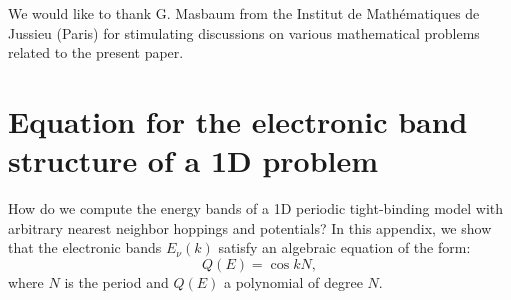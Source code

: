 \documentclass[]{revtex4-1}
\begin{document}
\acknowledgments

We would like to thank G. Masbaum from the Institut de Math\'ematiques de Jussieu (Paris) for stimulating discussions on various mathematical problems related to the present paper. 

\appendix

\section{Equation for the electronic band structure of a 1D problem} \label{charpolapp}


How do we compute the energy bands of a 1D periodic tight-binding model with arbitrary nearest neighbor hoppings and potentials? 
In this appendix, we show that the electronic bands  $E_{\nu}(k)$ satisfy an algebraic equation of the form:
\begin{equation}
Q(E)= \cos{kN},\label{bs2}
\end{equation}
where $N$ is the period and $Q(E)$ a polynomial of degree $N$. 
\end{document}
